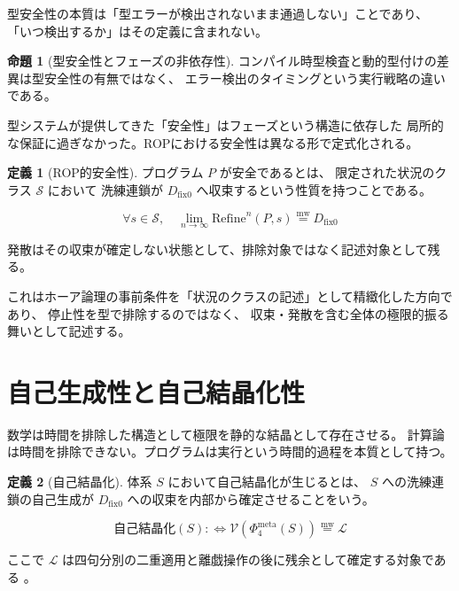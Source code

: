 \documentclass[11pt,a4paper]{article}
\theoremstyle{definition}
\newtheorem{definition}{定義}[section]
\newtheorem{proposition}{命題}[section]
\newcommand{\mweq}{\mathrel{\overset{\mathrm{mw}}{=}}}
\newcommand{\dfix}{D_{\mathrm{fix}0}}
\newcommand{\Lhagma}{\mathcal{L}}
\begin{document}
型安全性の本質は「型エラーが検出されないまま通過しない」ことであり、
「いつ検出するか」はその定義に含まれない。

\begin{proposition}[型安全性とフェーズの非依存性]
コンパイル時型検査と動的型付けの差異は型安全性の有無ではなく、
エラー検出のタイミングという実行戦略の違いである。
\end{proposition}

型システムが提供してきた「安全性」はフェーズという構造に依存した
局所的な保証に過ぎなかった。ROPにおける安全性は異なる形で定式化される。

\begin{definition}[ROP的安全性]
プログラム $P$ が安全であるとは、
限定された状況のクラス $\mathcal{S}$ において
洗練連鎖が $\dfix$ へ収束するという性質を持つことである。

\begin{equation}
\forall s \in \mathcal{S},\quad
\lim_{n \to \infty} \text{Refine}^n(P, s) \mweq \dfix
\end{equation}

発散はその収束が確定しない状態として、排除対象ではなく記述対象として残る。
\end{definition}

これはホーア論理の事前条件を「状況のクラスの記述」として精緻化した方向であり、
停止性を型で排除するのではなく、
収束・発散を含む全体の極限的振る舞いとして記述する。

\section{自己生成性と自己結晶化性}

数学は時間を排除した構造として極限を静的な結晶として存在させる。
計算論は時間を排除できない。プログラムは実行という時間的過程を本質として持つ。

\begin{definition}[自己結晶化]
体系 $S$ において自己結晶化が生じるとは、
$S$ への洗練連鎖の自己生成が $\dfix$ への収束を内部から確定させることをいう。

\begin{equation}
\text{自己結晶化}(S) :\Leftrightarrow
\mathcal{V}(\Phi_4^{\mathrm{meta}}(S)) \mweq \Lhagma
\end{equation}

ここで $\Lhagma$ は四句分別の二重適用と離戯操作の後に残余として確定する対象である
\cite{Chiba2026_lhagma}。
\end{definition}
\end{document}
